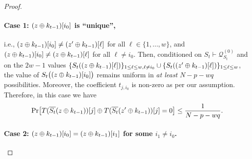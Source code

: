 \documentclass[journal=tosc,final,nohyperref]{iacrtrans}
\begin{document}
\begin{proof}
	
	
	
	
	\paragraph{Case 1: $(z\oplus k_{t-1})[i_0]$ is ``unique'',}
	
	i.e., $(z\oplus k_{t-1})[i_0]\neq(z'\oplus k_{t-1})[\ell]$ for all $\ell\in\{1,\ldots,w\}$, and $(z\oplus k_{t-1})[i_0]\neq(z\oplus k_{t-1})[\ell]$ for all $\ell\neq i_0$. Then, conditioned on $S_t\vdash\mathcal{Q}_{S_t}^{(0)}$ and on the $2w-1$ values $\{S_t((z\oplus k_{t-1})[\ell])\}_{1\leq \ell\leq w,\ell\neq i_0}\cup\{S_t((z'\oplus k_{t-1})[\ell])\}_{1\leq \ell\leq w}$, the value of $S_t\big((z\oplus k_{t-1})[i_0]\big)$ remains uniform in {\it at least} $N-p-wq$ possibilities. Moreover, the coefficient $t_{j,i_0}$ is non-zero as per our assumption. Therefore, in this case we have
	\begin{align}
	{\Pr}\big[T(\overline{S_t}(z\oplus k_{t-1}))[j]\oplus T(\overline{S_t}(z'\oplus k_{t-1}))[j]=0\big]\leq\frac{1}{N-p-wq}.
	\label{eq:bound-eq-B33}
	\end{align}
	
	
	\paragraph{Case 2: $(z\oplus k_{t-1})[i_0]=(z\oplus k_{t-1})[i_1]$ for some $i_1\neq i_0$.}
	

\end{proof}
\end{document}
